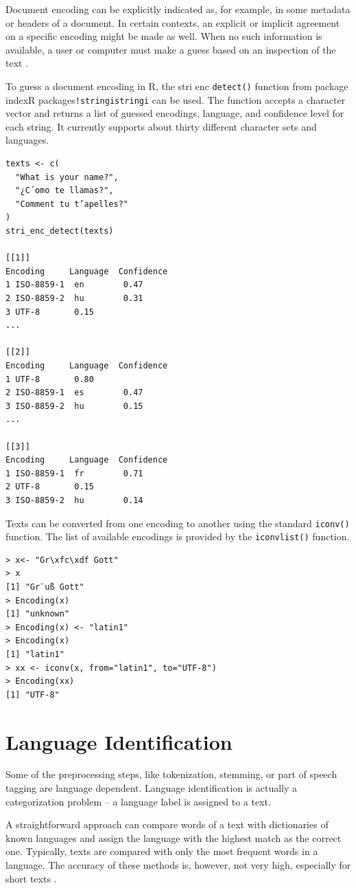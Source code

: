Document encoding can be explicitly indicated as, for example, in some
metadata or headers of a document. In certain contexts, an explicit or implicit
agreement on a specific encoding might be made as well. When no such information is available, a user or computer must make a guess based on an inspection
of the text \cite{ref149}.

To guess a document encoding in R, the stri enc \texttt{detect()} function from
package indexR packages\texttt{!stringistringi} can be used. The function accepts a
character vector and returns a list of guessed encodings, language, and confidence level for each string. It currently supports about thirty different character
sets and languages.

\begin{verbatim}
texts <- c(
  "What is your name?",
  "¿C´omo te llamas?",
  "Comment tu t’apelles?"
)
stri_enc_detect(texts)

[[1]]
Encoding     Language  Confidence
1 ISO-8859-1  en        0.47
2 ISO-8859-2  hu        0.31
3 UTF-8       0.15
...

[[2]]
Encoding     Language  Confidence
1 UTF-8       0.80
2 ISO-8859-1  es        0.47
3 ISO-8859-2  hu        0.15
...

[[3]]
Encoding     Language  Confidence
1 ISO-8859-1  fr        0.71
2 UTF-8       0.15
3 ISO-8859-2  hu        0.14
\end{verbatim}

Texts can be converted from one encoding to another using the standard \texttt{iconv()} function. The list of available encodings is provided by the
\texttt{iconvlist()} function.

\begin{verbatim}
> x<- "Gr\xfc\xdf Gott"
> x
[1] "Gr¨uß Gott"
> Encoding(x)
[1] "unknown"
> Encoding(x) <- "latin1"
> Encoding(x)
[1] "latin1"
> xx <- iconv(x, from="latin1", to="UTF-8")
> Encoding(xx)
[1] "UTF-8"
\end{verbatim}

\section{Language Identification}

Some of the preprocessing steps, like tokenization, stemming, or part of speech
tagging are language dependent. Language identification is actually a categorization problem – a language label is assigned to a text.

A straightforward approach can compare words of a text with dictionaries of
known languages and assign the language with the highest match as the correct
one. Typically, texts are compared with only the most frequent words in a language. The accuracy of these methods is, however, not very high, especially for
short texts \cite{ref106}.

